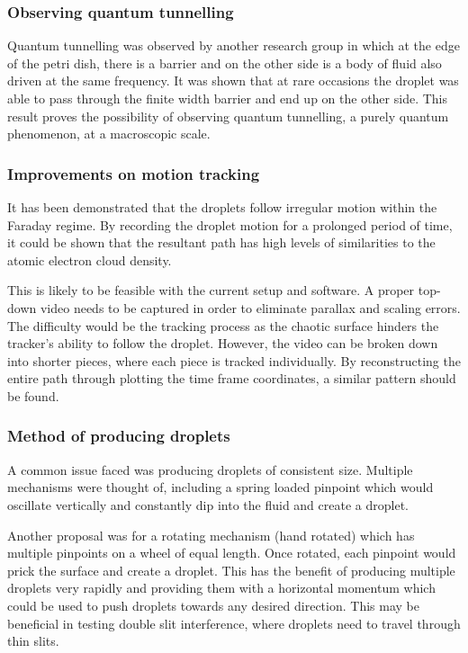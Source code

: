 \subsubsection{Observing quantum tunnelling}
Quantum tunnelling was observed by another research group \cite{brady2014bouncing} in which at the edge of the petri dish, there is a barrier and on the other side is a body of fluid also driven at the same frequency. It was shown that at rare occasions the droplet was able to pass through the finite width barrier and end up on the other side. This result proves the possibility of observing quantum tunnelling, a purely quantum phenomenon, at a macroscopic scale.

\subsubsection{Improvements on motion tracking}
It has been demonstrated that the droplets follow irregular motion within the Faraday regime. By recording the droplet motion for a prolonged period of time, it could be shown that the resultant path has high levels of similarities to the atomic electron cloud density. 

This is likely to be feasible with the current setup and software. A proper top-down video needs to be captured in order to eliminate parallax and scaling errors. The difficulty would be the tracking process as the chaotic surface hinders the tracker's ability to follow the droplet. However, the video can be broken down into shorter pieces, where each piece is tracked individually. By reconstructing the entire path through plotting the time frame coordinates, a similar pattern should be found.

\subsubsection{Method of producing droplets}
A common issue faced was producing droplets of consistent size. Multiple mechanisms were thought of, including a spring loaded pinpoint which would oscillate vertically and constantly dip into the fluid and create a droplet.

Another proposal was for a rotating mechanism (hand rotated) which has multiple pinpoints on a wheel of equal length. Once rotated, each pinpoint would prick the surface and create a droplet. This has the benefit of producing multiple droplets very rapidly and providing them with a horizontal momentum which could be used to push droplets towards any desired direction. This may be beneficial in testing double slit interference, where droplets need to travel through thin slits.

